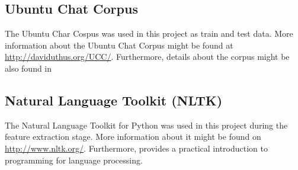 \documentclass{article} %
\begin{document}

\subsection*{Ubuntu Chat Corpus \label{sec:ubuntudata}}
The Ubuntu Char Cospus was used in this project as train and test data. More information about the Ubuntu Chat Corpus might be found at \url{http://daviduthus.org/UCC/}. Furthermore, details about the corpus might be also found in \cite{ubuntudata}

\subsection*{Natural Language Toolkit (NLTK)}

The Natural Language Toolkit for Python was used in this project during the feature extraction stage. More information about it might be found on \url{http://www.nltk.org/}. Furthermore, \cite{nltk} provides a practical introduction to programming for language processing.
\end{document}
